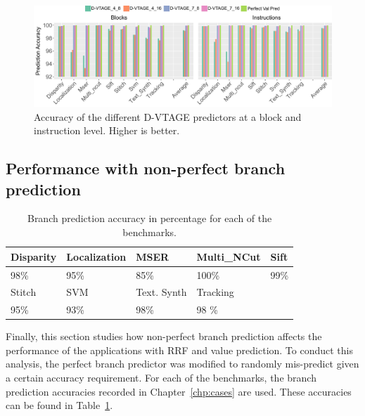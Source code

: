 \begin{figure}[t]
    \centering
    \includegraphics[width=1\textwidth]{chapter3/graphics/predAcc.pdf}
    \caption{Accuracy of the different D-VTAGE predictors at a block and instruction level. Higher is better.}
    \label{fig:vtag_accuracy_block}
\end{figure}

\subsection{Performance with non-perfect branch prediction}

\begin{table}[t]
  \small
  \centering
 \begin{tabular} { | l | l | l | l | l | }
 \hline
   \cellcolor[gray]{0.7}Disparity & \cellcolor[gray]{0.7} Localization& \cellcolor[gray]{0.7} MSER& \cellcolor[gray]{0.7} Multi\_NCut& \cellcolor[gray]{0.7} Sift\\ \hline
	98\%  & 95\% & 85\%  & 100\%& 99\%\\ \hline
	 \cellcolor[gray]{0.7} Stitch & \cellcolor[gray]{0.7} SVM & \cellcolor[gray]{0.7} Text. Synth & \cellcolor[gray]{0.7} Tracking&\\ \hline
	  95\%& 93\%& 98\%& 98 \%&\\ \hline
	\end{tabular}
  \caption{Branch prediction accuracy in percentage for each of the benchmarks.}\label{tab:sd-vbsbpred2}
  \vspace{1em}
\end{table}

Finally, this section studies how non-perfect branch prediction affects the performance of the applications with RRF and value prediction.
To conduct this analysis, the perfect branch predictor was modified to randomly mis-predict given a certain accuracy requirement.
For each of the benchmarks, the branch prediction accuracies recorded in Chapter~\ref{chp:cases} are used.
These accuracies can be found in Table~\ref{tab:sd-vbsbpred2}.

